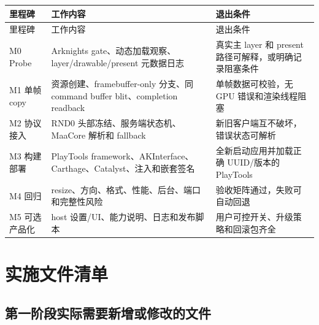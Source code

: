 \documentclass[UTF8,a4paper,11pt]{ctexart}
\begin{document}
\begin{center}
\small
\begin{longtable}{>{\raggedright\arraybackslash}p{} >{\raggedright\arraybackslash}p{} >{\raggedright\arraybackslash}p{}}
\toprule
里程碑 & 工作内容 & 退出条件 \\
\midrule
\endfirsthead
\toprule
里程碑 & 工作内容 & 退出条件 \\
\midrule
\endhead
M0 Probe & Arknights gate、动态加载观察、layer/drawable/present 元数据日志 & 真实主 layer 和 present 路径可解释，或明确记录阻塞条件 \\
M1 单帧 copy & 资源创建、framebuffer-only 分支、同 command buffer blit、completion readback & 单帧数据可校验，无 GPU 错误和渲染线程阻塞 \\
M2 协议接入 & RND0 头部冻结、服务端状态机、MaaCore 解析和 fallback & 新旧客户端互不破坏，错误状态可解析 \\
M3 构建部署 & PlayTools framework、AKInterface、Carthage、Catalyst、注入和嵌套签名 & 全新启动应用并加载正确 UUID/版本的 PlayTools \\
M4 回归 & resize、方向、格式、性能、后台、端口和完整性风险 & 验收矩阵通过，失败可自动回退 \\
M5 可选产品化 & host 设置/UI、能力说明、日志和发布脚本 & 用户可控开关、升级策略和回滚包齐全 \\
\bottomrule
\end{longtable}
\end{center}

\section{实施文件清单}

\subsection{第一阶段实际需要新增或修改的文件}
\end{document}
